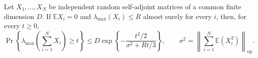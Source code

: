 Let \(X_1,\ldots,X_N\) be independent random self-adjoint matrices of a common finite dimension \(D\).  If \(\mathbb E X_i=0\) and \(\lambda_{\max}(X_i)\leq R\) almost surely for every \(i\), then, for every \(t\geq0\),
\[
\Pr\!\left\{\lambda_{\max}\!\left(\sum_{i=1}^N X_i\right)\geq t\right\}
\leq D\exp\!\left\{-\frac{t^2/2}{\sigma^2+Rt/3}\right\},
\qquad
\sigma^2=\left\|\sum_{i=1}^N\mathbb E(X_i^2)\right\|_{\mathrm{op}}.
\]